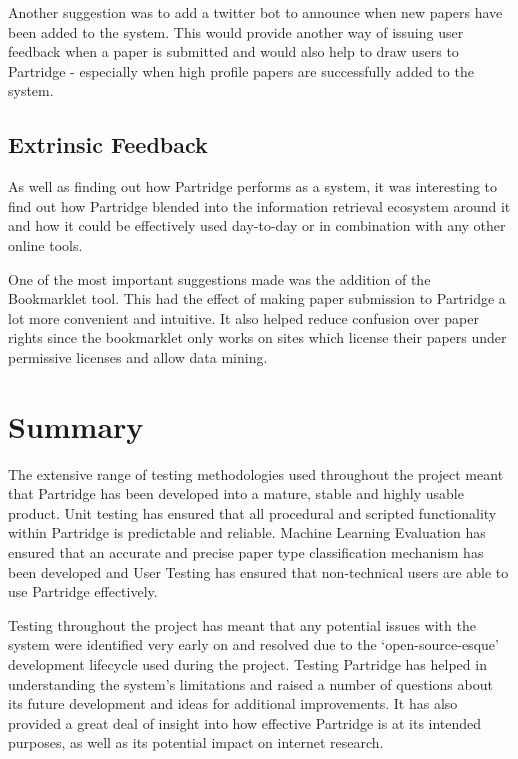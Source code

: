 Another suggestion was to add a twitter bot to announce when new papers have
been added to the system. This would provide another way of issuing user
feedback when a paper is submitted and would also help to draw users to
Partridge - especially when high profile papers are successfully added to the
system.

\subsection{Extrinsic Feedback}

As well as finding out how Partridge performs as a system, it was interesting
to find out how Partridge blended into the information retrieval ecosystem around
it and how it could be effectively used day-to-day or in combination with any other
online tools.

One of the most important suggestions made was the addition of the Bookmarklet
tool. This had the effect of making paper submission to Partridge a lot more
convenient and intuitive. It also helped reduce confusion over paper
rights since the bookmarklet only works on sites which license
their papers under permissive licenses and allow data mining. 

\section{Summary}

The extensive range of testing methodologies used throughout the project meant
that Partridge has been developed into a mature, stable and highly usable
product. Unit testing has ensured that all procedural and scripted
functionality within Partridge is predictable and reliable. Machine Learning
Evaluation has ensured that an accurate and precise paper type classification
mechanism has been developed and User Testing has ensured that non-technical
users are able to use Partridge effectively.

Testing throughout the project has meant that any potential
issues with the system were identified very early on and resolved due to the
`open-source-esque' development lifecycle used during the project.  Testing
Partridge has helped in understanding the system's limitations and raised a
number of questions about its future development and ideas for additional
improvements. It has also provided a great deal of insight into how effective
Partridge is at its intended purposes, as well as its potential impact on
internet research.
